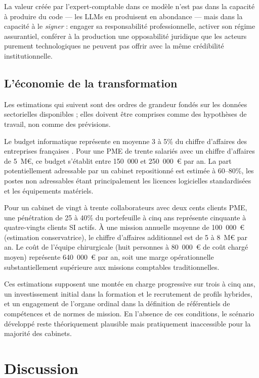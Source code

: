 \documentclass[12pt,a4paper]{article}
\begin{document}
La valeur créée par l'expert-comptable dans ce modèle n'est pas dans la capacité à produire du code — les LLMs en produisent en abondance — mais dans la capacité à le \emph{signer} : engager sa responsabilité professionnelle, activer son régime assurantiel, conférer à la production une opposabilité juridique que les acteurs purement technologiques ne peuvent pas offrir avec la même crédibilité institutionnelle.

\subsection{L'économie de la transformation}

Les estimations qui suivent sont des ordres de grandeur fondés sur les données sectorielles disponibles ; elles doivent être comprises comme des hypothèses de travail, non comme des prévisions.

Le budget informatique représente en moyenne 3 à 5\% du chiffre d'affaires des entreprises françaises \parencite{cigref2023}. Pour une PME de trente salariés avec un chiffre d'affaires de 5~M€, ce budget s'établit entre 150~000 et 250~000~€ par an. La part potentiellement adressable par un cabinet repositionné est estimée à 60--80\%, les postes non adressables étant principalement les licences logicielles standardisées et les équipements matériels.

Pour un cabinet de vingt à trente collaborateurs avec deux cents clients PME, une pénétration de 25 à 40\% du portefeuille à cinq ans représente cinquante à quatre-vingts clients SI actifs. À une mission annuelle moyenne de 100~000~€ (estimation conservatrice), le chiffre d'affaires additionnel est de 5 à 8~M€ par an. Le coût de l'équipe chirurgicale (huit personnes à 80~000~€ de coût chargé moyen) représente 640~000~€ par an, soit une marge opérationnelle substantiellement supérieure aux missions comptables traditionnelles.

Ces estimations supposent une montée en charge progressive sur trois à cinq ans, un investissement initial dans la formation et le recrutement de profils hybrides, et un engagement de l'organe ordinal dans la définition de référentiels de compétences et de normes de mission. En l'absence de ces conditions, le scénario développé reste théoriquement plausible mais pratiquement inaccessible pour la majorité des cabinets.

\section{Discussion}
\end{document}
